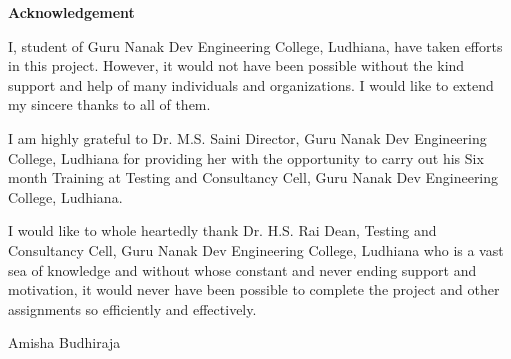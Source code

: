 \begin{center}
{\Huge \bf{Acknowledgement}\vskip 0.2in}
\end{center}

I, student of Guru Nanak Dev Engineering College, Ludhiana, have taken efforts in this project.
However, it would not have been possible without the kind support and help of many individuals
and organizations. I would like to extend my sincere thanks to all of them.

I am highly grateful to Dr. M.S. Saini Director, Guru Nanak Dev Engineering College, Ludhiana for providing her with the opportunity to carry out his Six month Training at
Testing and Consultancy Cell, Guru Nanak Dev Engineering College, Ludhiana.

I would like to whole heartedly thank Dr. H.S. Rai Dean, Testing and Consultancy
Cell, Guru Nanak Dev Engineering College, Ludhiana who is a vast sea of knowledge and without whose constant and never ending support and motivation, it would never have been possible to complete the project and other assignments so efficiently and effectively.

\vskip 1.0cm 
\noindent Amisha Budhiraja



